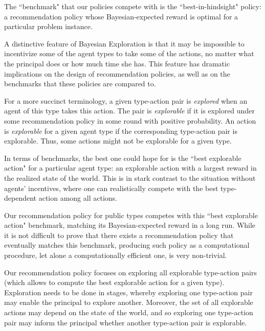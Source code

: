 The ``benchmark" that our policies compete with is the ``best-in-hindsight"
policy: a recommendation policy whose Bayesian-expected reward is optimal for a particular problem instance.  


A distinctive feature of Bayesian Exploration is that it may be impossible to incentivize some of the agent types to take some of the actions, no matter what the principal does or how much time she has. This feature has dramatic implications on the design of recommendation policies, as well as on the benchmarks that these policies are compared to.

For a more succinct terminology, a given type-action pair is \emph{explored} when an agent of this type takes this action. The pair is \emph{explorable} if it is explored under some recommendation policy in some round with positive probability. An action is \emph{explorable} for a given agent type if the corresponding type-action pair is explorable. Thus, some actions might not be explorable for a given type.  

In terms of benchmarks, the best one could hope for is the ``best explorable action" for a particular agent type: an explorable action with a largest reward in the realized state of the world. This is in stark contrast to the situation without agents' incentives, where one can realistically compete with the best type-dependent action among all actions.

Our recommendation policy for public types competes with this ``best explorable action" benchmark, matching its Bayesian-expected reward in a long run. While it is not difficult to prove that there exists a recommendation policy that eventually matches this benchmark, producing such policy as a computational procedure, let alone a computationally efficient one, is very non-trivial.

Our recommendation policy focuses on exploring all explorable type-action pairs (which allows to compute the best explorable action for a given type). Exploration needs to be done in stages, whereby exploring one type-action pair may enable the principal to explore another. Moreover, the set of all explorable actions may depend on the state of the world, and so  exploring one type-action pair may inform the principal whether another type-action pair is explorable. 


